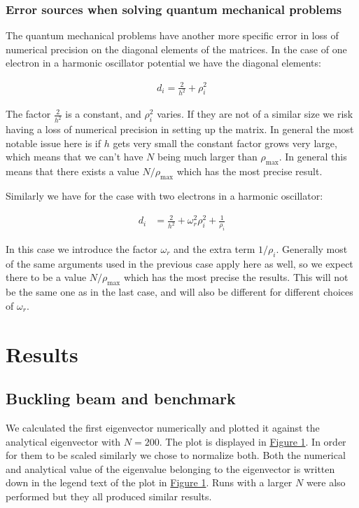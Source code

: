 \documentclass[reprint,english,notitlepage]{revtex4-1}  %
\begin{document}
\subsubsection{Error sources when solving quantum mechanical problems} \label{sec:III:b:i}

The quantum mechanical problems have another more specific error in loss of numerical precision on the diagonal elements of the matrices. In the case of one electron in a harmonic oscillator potential we have the diagonal elements:

\begin{align*}
d_i = \frac{2}{h^2} + \rho_i^2
\end{align*}

The factor $\frac{2}{h^2}$ is a constant, and $\rho_i^2$ varies. If they are not of a similar size we risk having a loss of numerical precision in setting up the matrix. In general the most notable issue here is if $h$ gets very small the constant factor grows very large, which means that we can't have $N$ being much larger than $\rho_\text{max}$. In general this means that there exists a value $N/\rho_\text{max}$ which has the most precise result.

Similarly we have for the case with two electrons in a harmonic oscillator:

\begin{align*}
d_i &= \frac{2}{h^2} + \omega_r^2 \rho_i^2 + \frac{1}{\rho_i}
\end{align*}

In this case we introduce the factor $\omega_r$ and the extra term $1/\rho_i$. Generally most of the same arguments used in the previous case apply here as well, so we expect there to be a value $N/\rho_\text{max}$ which has the most precise the results. This will not be the same one as in the last case, and will also be different for different choices of $\omega_r$.

\newpage

\section{Results} \label{sec:IV}

\subsection{Buckling beam and benchmark} \label{sec:IV:a}

We calculated the first eigenvector numerically and plotted it against the analytical eigenvector with $N=200$. The plot is displayed in \hyperref[fig:IV:a:1]{Figure 1}. In order for them to be scaled similarly we chose to normalize both. Both the numerical and analytical value of the eigenvalue belonging to the eigenvector is written down in the legend text of the plot in \hyperref[fig:IV:a:1]{Figure 1}. Runs with a larger $N$ were also performed but they all produced similar results.
\end{document}
